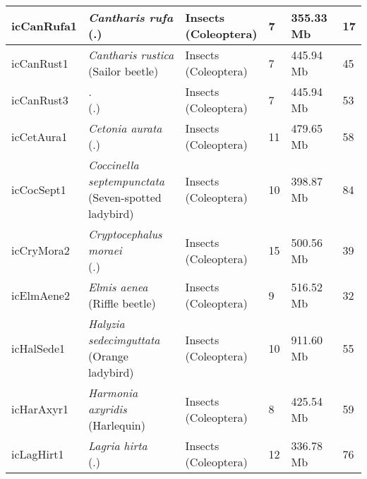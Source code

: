 \begin{centering}
\begin{longtable}{l|l|l|l|l|l}
icCanRufa1 & \makecell[{l}]{\textit{Cantharis rufa} \\ (.)} & \makecell[{l}]{Insects \\ (Coleoptera)} & 7 & 355.33 Mb & 17  \\ \hline
icCanRust1 & \makecell[{l}]{\textit{Cantharis rustica} \\ (Sailor beetle)} & \makecell[{l}]{Insects \\ (Coleoptera)} & 7 & 445.94 Mb & 45  \\ \hline
icCanRust3 & \makecell[{l}]{\textit{.} \\ (.)} & \makecell[{l}]{Insects \\ (Coleoptera)} & 7 & 445.94 Mb & 53  \\ \hline
icCetAura1 & \makecell[{l}]{\textit{Cetonia aurata} \\ (.)} & \makecell[{l}]{Insects \\ (Coleoptera)} & 11 & 479.65 Mb & 58  \\ \hline
icCocSept1 & \makecell[{l}]{\textit{Coccinella septempunctata} \\ (Seven-spotted ladybird)} & \makecell[{l}]{Insects \\ (Coleoptera)} & 10 & 398.87 Mb & 84  \\ \hline
icCryMora2 & \makecell[{l}]{\textit{Cryptocephalus moraei} \\ (.)} & \makecell[{l}]{Insects \\ (Coleoptera)} & 15 & 500.56 Mb & 39  \\ \hline
icElmAene2 & \makecell[{l}]{\textit{Elmis aenea} \\ (Riffle beetle)} & \makecell[{l}]{Insects \\ (Coleoptera)} & 9 & 516.52 Mb & 32  \\ \hline
icHalSede1 & \makecell[{l}]{\textit{Halyzia sedecimguttata} \\ (Orange ladybird)} & \makecell[{l}]{Insects \\ (Coleoptera)} & 10 & 911.60 Mb & 55  \\ \hline
icHarAxyr1 & \makecell[{l}]{\textit{Harmonia axyridis} \\ (Harlequin)} & \makecell[{l}]{Insects \\ (Coleoptera)} & 8 & 425.54 Mb & 59  \\ \hline
icLagHirt1 & \makecell[{l}]{\textit{Lagria hirta} \\ (.)} & \makecell[{l}]{Insects \\ (Coleoptera)} & 12 & 336.78 Mb & 76  \\ \hline

\end{longtable}
\end{centering}
